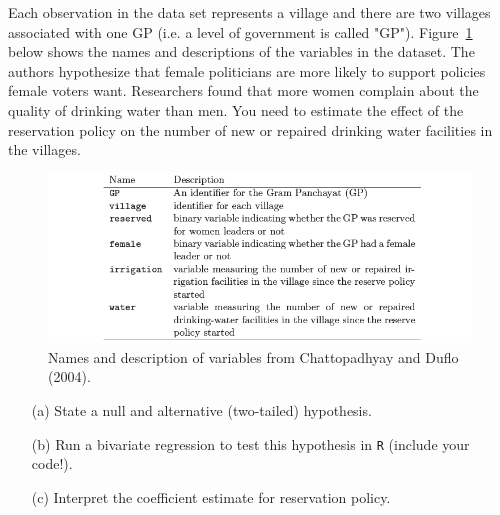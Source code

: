\documentclass[12pt,letterpaper]{article}
\begin{document}
\noindent Each observation in the data set represents a village and there are two villages associated with one GP (i.e. a level of government is called "GP"). Figure~\ref{fig:women_desc} below shows the names and descriptions of the variables in the dataset. The authors hypothesize that female politicians are more likely to support policies female voters want. Researchers found that more women complain about the quality of drinking water than men. You need to estimate the effect of the reservation policy on the number of new or repaired drinking water facilities in the villages.
\vspace{.5cm}
\begin{figure}[h!]
	\caption{\footnotesize{Names and description of variables from Chattopadhyay and Duflo (2004).}}
	\vspace{.5cm}
	\centering
	\label{fig:women_desc}
	\includegraphics[width=1.1\textwidth]{women_desc.png}
\end{figure}		

\newpage
\begin{enumerate}
	\item [(a)] State a null and alternative (two-tailed) hypothesis. 
	
	\vspace{6cm}
	\item [(b)] Run a bivariate regression to test this hypothesis in \texttt{R} (include your code!).
	
	\vspace{6cm}
	\item [(c)] Interpret the coefficient estimate for reservation policy. 
\end{enumerate}
\end{document}
